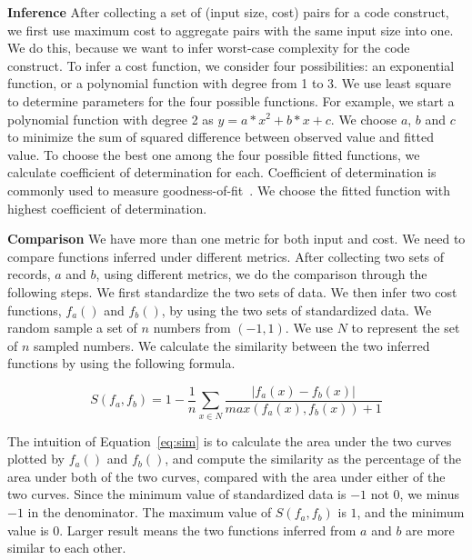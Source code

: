 \noindent\textbf{Inference}
After collecting a set of (input size, cost) pairs for a code construct,
we first use maximum cost to aggregate pairs with the same input size into one.
We do this, because we want to infer worst-case complexity for the code construct. 
To infer a cost function,
we consider four possibilities: 
an exponential function, or a polynomial function with degree from 1 to 3.
 We use least square~\cite{least} to determine parameters for the four possible functions. 
For example, we start a polynomial function with degree 2 as $y=a*x^2 + b*x +c$.
We choose $a$, $b$ and $c$ to minimize the sum of squared difference between 
observed value and fitted value.  
To choose the best one among the four possible fitted functions, 
we calculate coefficient of determination for each. 
Coefficient of determination is commonly used to measure goodness-of-fit~\cite{codeter}.
We choose the fitted function with highest coefficient of determination. 


\noindent\textbf{Comparison}
We have more than one metric for both input and cost.
We need to compare functions inferred under different metrics. 
After collecting two sets of records, $a$ and $b$, using different metrics, 
we do the comparison through the following steps. 
We first standardize the two sets of data. 
We then infer two cost functions, $f_a()$ and $f_b()$, 
by using the two sets of standardized data.
We random sample a set of $n$ numbers from $(-1, 1)$.
We use $N$ to represent the set of $n$ sampled numbers.  
We calculate the similarity between the two inferred 
functions by using the following formula. 



\begin{equation} \label{eq:sim}
S(f_a, f_b) = 1 - \frac{1}{n}\sum_{x \in N}\frac{|f_a(x) - f_b(x)|}{max(f_a(x),f_b(x))+1}
\end{equation}

The intuition of Equation~\ref{eq:sim} is to calculate the area under the two curves 
plotted by $f_a()$ and $f_b()$, 
and compute the similarity as the percentage of the area under both of the two curves, 
compared with the area under either of the two curves.
Since the minimum value of standardized data is $-1$ not $0$,
we minus $-1$ in the denominator.
The maximum value of $S(f_a, f_b)$ is $1$, and the minimum value is $0$.
Larger result means the two functions inferred from $a$ and $b$ are more similar to each other. 



